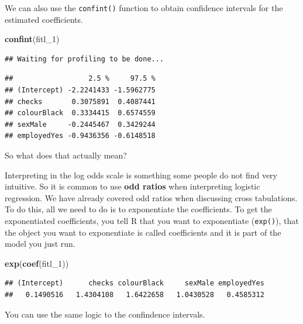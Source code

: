 \documentclass[]{book}
\newenvironment{Shaded}{\begin{snugshade}}{\end{snugshade}}
\newcommand{\CommentTok}[1]{\textcolor[rgb]{0.56,0.35,0.01}{\textit{#1}}}
\newcommand{\DataTypeTok}[1]{\textcolor[rgb]{0.13,0.29,0.53}{#1}}
\newcommand{\DecValTok}[1]{\textcolor[rgb]{0.00,0.00,0.81}{#1}}
\newcommand{\KeywordTok}[1]{\textcolor[rgb]{0.13,0.29,0.53}{\textbf{#1}}}
\newcommand{\NormalTok}[1]{#1}
\theoremstyle{definition}
\theoremstyle{definition}
\theoremstyle{definition}
\theoremstyle{remark}
\begin{document}
We can also use the \texttt{confint()} function to obtain confidence
intervals for the estimated coefficients.

\begin{Shaded}
\begin{Highlighting}[]
\KeywordTok{confint}\NormalTok{(fitl_}\DecValTok{1}\NormalTok{)}
\end{Highlighting}
\end{Shaded}

\begin{verbatim}
## Waiting for profiling to be done...
\end{verbatim}

\begin{verbatim}
##                  2.5 %     97.5 %
## (Intercept) -2.2241433 -1.5962775
## checks       0.3075891  0.4087441
## colourBlack  0.3334415  0.6574559
## sexMale     -0.2445467  0.3429244
## employedYes -0.9436356 -0.6148518
\end{verbatim}

So what does that actually mean?

Interpreting in the log odds scale is something some people do not find
very intuitive. So it is common to use \textbf{odd ratios} when
interpreting logistic regression. We have already covered odd ratios
when discussing cross tabulations. To do this, all we need to do is to
exponentiate the coefficients. To get the exponentiated coefficients,
you tell R that you want to exponentiate (\texttt{exp()}), that the
object you want to exponentiate is called coefficients and it is part of
the model you just run.

\begin{Shaded}
\begin{Highlighting}[]
\KeywordTok{exp}\NormalTok{(}\KeywordTok{coef}\NormalTok{(fitl_}\DecValTok{1}\NormalTok{))}
\end{Highlighting}
\end{Shaded}

\begin{verbatim}
## (Intercept)      checks colourBlack     sexMale employedYes 
##   0.1490516   1.4304108   1.6422658   1.0430528   0.4585312
\end{verbatim}

You can use the same logic to the confindence intervals.

\begin{Shaded}
\end{Shaded}
\end{document}
